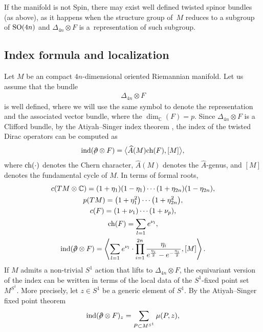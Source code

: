 \documentclass[10pt,a4paper]{amsart}
\newcommand{\A}{\mbox{$\widehat A$}}
\newcommand{\ind}{\mbox{\rm ind}}
\newcommand{\ch}{\mbox{\rm ch}}
\newcommand{\dirac}{/\kern-5pt\partial}
\numberwithin{equation}{section}
\begin{document}
\begin{Remark}
If the manifold is not Spin, there may exist well def\/ined twisted spinor bundles (as above), as it happens when the structure group of~$M$ reduces to a subgroup of ${\rm SO}(4n)$ and $\Delta_{4n}\otimes F$ is a~representation of such subgroup.
\end{Remark}

\subsection{Index formula and localization}\label{subsec: localization}

Let $M$ be an compact $4n$-dimensional oriented Riemannian manifold. Let us assume that the bundle
\begin{gather*}\Delta_{4n}\otimes F\end{gather*}
is well def\/ined, where we will use the same symbol to denote the representation and the associated vector bundle, where the $\dim_{\mathbb{C}}(F)=p$. Since $\Delta_{4n}\otimes F$ is a Clif\/ford bundle, by the Atiyah--Singer index theorem \cite{Berline,Roe}, the index of the twisted Dirac operators can be computed as
\begin{gather*}\ind(\dirac\otimes F) = \big\langle \A(M) \ch(F),[M]\big\rangle,\end{gather*}
where $\ch(\cdot)$ denotes the Chern character, $\A(M)$ denotes the \A-genus, and $[M]$ denotes the fundamental cycle of $M$. In terms of formal roots,
\begin{gather*}
c(TM\otimes\mathbb{C})= (1+\eta_1)(1-\eta_1)\cdots (1+\eta_{2n})(1-\eta_{2n}),\\
 p(TM)= \big(1+\eta_1^2\big)\cdots \big(1+\eta_{2n}^2\big),\\
 c(F) = (1+\nu_1)\cdots (1+\nu_{p}),\\
 \ch(F)= \sum_{l=1} e^{\nu_l}, \\
 \ind(\dirac\otimes F) = \left\langle \sum_{l=1} e^{\nu_l} \cdot \prod_{i=1}^{2n}
{ \eta_i \over e^{\eta_i\over2}-e^{-{\eta_i\over2}}},[M]\right\rangle .
\end{gather*}
If $M$ admits a non-trivial $S^1$ action that lifts to $\Delta_{4n}\otimes F$, the equivariant version of the index can be written in terms of the local data of the $S^1$-f\/ixed point set~$M^{S^1}$. More precisely, let $z\in S^1$ be a generic element of $S^1$. By the Atiyah--Singer f\/ixed point theorem~\cite{AS3,Berline}
\begin{gather*}\ind(\dirac\otimes F)_{z}= \sum_{P\subset M^{S^1}} \mu(P,z),\end{gather*}
\end{document}
